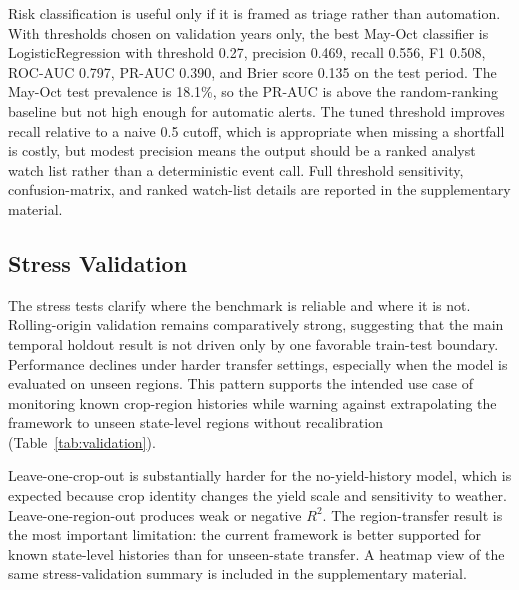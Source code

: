 \documentclass[wcp]{jmlr}
\DeclareRobustCommand{\Rsq}{\BeginAccSupp{method=hex,unicode,ActualText=005200B2}\ensuremath{R^2}\EndAccSupp{}}
\begin{document}
Risk classification is useful only if it is framed as triage rather than automation. With thresholds chosen on validation years only, the best May-Oct classifier is LogisticRegression with threshold 0.27, precision 0.469, recall 0.556, F1 0.508, ROC-AUC 0.797, PR-AUC 0.390, and Brier score 0.135 on the test period. The May-Oct test prevalence is 18.1\%, so the PR-AUC is above the random-ranking baseline but not high enough for automatic alerts. The tuned threshold improves recall relative to a naive 0.5 cutoff, which is appropriate when missing a shortfall is costly, but modest precision means the output should be a ranked analyst watch list rather than a deterministic event call. Full threshold sensitivity, confusion-matrix, and ranked watch-list details are reported in the supplementary material.

\subsection{Stress Validation}

The stress tests clarify where the benchmark is reliable and where it is not. Rolling-origin validation remains comparatively strong, suggesting that the main temporal holdout result is not driven only by one favorable train-test boundary. Performance declines under harder transfer settings, especially when the model is evaluated on unseen regions. This pattern supports the intended use case of monitoring known crop-region histories while warning against extrapolating the framework to unseen state-level regions without recalibration (Table~\ref{tab:validation}).

Leave-one-crop-out is substantially harder for the no-yield-history model, which is expected because crop identity changes the yield scale and sensitivity to weather. Leave-one-region-out produces weak or negative \Rsq{}. The region-transfer result is the most important limitation: the current framework is better supported for known state-level histories than for unseen-state transfer. A heatmap view of the same stress-validation summary is included in the supplementary material.

\begin{table}[t]
\centering
\caption{Compact stress validation summary. Rows report mean performance across the folds and forecast windows belonging to each protocol for the best model within a feature regime. The held-out-test row is therefore an all-window stress summary, not the May-Oct-only result in Table~\ref{tab:lead-time}; leave-one-region-out is a deliberately hard unseen-region test.}
\label{tab:validation}
\resizebox{\textwidth}{!}{}
\end{table}
\FloatBarrier
\end{document}
